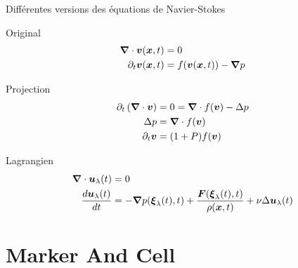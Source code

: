 \begin{frame}[<+->]{Différentes versions des équations de Navier-Stokes}
 \begin{block}{Original}
 \begin{align*}
  {\boldsymbol {\nabla}} \cdot {\boldsymbol {v}}({\boldsymbol {x}} ,t)&=0\\
\partial_t {\boldsymbol {v}}({\boldsymbol {x}} ,t)&=f({\boldsymbol {v}}({\boldsymbol {x}},t))-{\boldsymbol {\nabla}}p
\end{align*}
 \end{block}
 \begin{block}{Projection}
 \begin{align*}
    \partial_t \left({\boldsymbol {\nabla}}\cdot {\boldsymbol {v}}\right)&=0={\boldsymbol {\nabla}}\cdot f({\boldsymbol {v}})-\Delta p\\
  \Delta p&={\boldsymbol {\nabla}}\cdot f({\boldsymbol {v}})\\
  \partial_t {\boldsymbol {v}}&=(1+P)f({\boldsymbol {v}})
  \end{align*}
 \end{block}

 \begin{block}{Lagrangien}
  \begin{align*}
{\boldsymbol {\nabla}} \cdot {\boldsymbol {u}}_{\lambda}(t)&=0\\
\frac{d {\boldsymbol {u}}_{\lambda}(t)}{d t}&=-{\boldsymbol {\nabla}} p({\boldsymbol {\xi}}_{\lambda}(t),t)+\frac{{\boldsymbol {F}}({\boldsymbol {\xi}}_{\lambda}(t),t)}{\rho({\boldsymbol {x}},t)}+\nu \Delta {\boldsymbol {u}}_{\lambda}(t)
 \end{align*}
 \end{block}


\end{frame}

\section{Marker And Cell}
